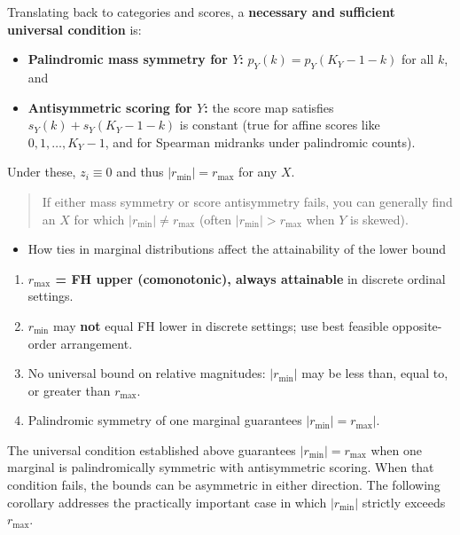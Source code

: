 \documentclass[
  12pt,
]{article}
\providecommand{\tightlist}{%
  \setlength{\itemsep}{0pt}\setlength{\parskip}{0pt}}
\theoremstyle{plain}
\theoremstyle{definition}
\theoremstyle{remark}
\begin{document}
Translating back to categories and scores, a \textbf{necessary and
sufficient universal condition} is:

\begin{itemize}
\item
  \textbf{Palindromic mass symmetry for \(Y\):} \(p_Y(k)=p_Y(K_Y-1-k)\)
  for all \(k\), and
\item
  \textbf{Antisymmetric scoring for \(Y\):} the score map satisfies
  \(s_Y(k)+s_Y(K_Y-1-k)\) is constant (true for affine scores like
  \(0,1,\dots,K_Y-1\), and for Spearman midranks under palindromic
  counts).
\end{itemize}

Under these, \(z_i\equiv 0\) and thus \(|r_{\min}|=r_{\max}\) for any
\(X\).

\begin{quote}
If either mass symmetry or score antisymmetry fails, you can generally
find an \(X\) for which \(|r_{\min}|\ne r_{\max}\) (often
\(|r_{\min}|>r_{\max}\) when \(Y\) is skewed).
\end{quote}

\begin{itemize}
\tightlist
\item
  How ties in marginal distributions affect the attainability of the
  lower bound
\end{itemize}

\begin{enumerate}
\def\labelenumi{\arabic{enumi}.}
\tightlist
\item
  \textbf{\(r_{\max}\) = FH upper (comonotonic), always attainable} in
  discrete ordinal settings.
\item
  \textbf{\(r_{\min}\)} may \textbf{not} equal FH lower in discrete
  settings; use best feasible opposite-order arrangement.
\item
  No universal bound on relative magnitudes: \(|r_{\min}|\) may be less
  than, equal to, or greater than \(r_{\max}\).
\item
  Palindromic symmetry of one marginal guarantees
  \(|r_{\min}| = r_{\max}|\).
\end{enumerate}

The universal condition established above guarantees
\(|r_{\min}| = r_{\max}\) when one marginal is palindromically symmetric
with antisymmetric scoring. When that condition fails, the bounds can be
asymmetric in either direction. The following corollary addresses the
practically important case in which \(|r_{\min}|\) strictly exceeds
\(r_{\max}\).
\end{document}
